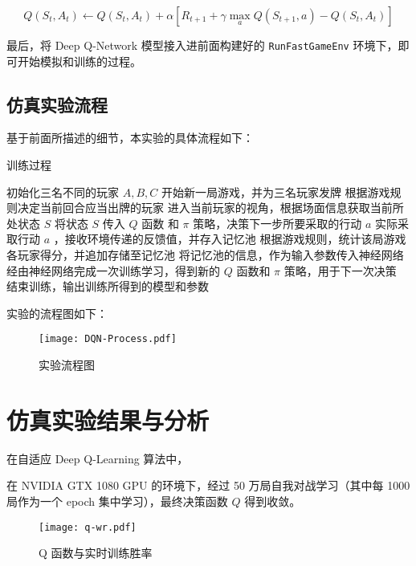 \begin{equation}
    Q(S_t,A_t)\leftarrow Q(S_t,A_t)+\alpha\left[R_{t+1}+\gamma  \max\limits_aQ(S_{t+1},a)-Q(S_t,A_t)\right]
\end{equation}

最后，将 Deep Q-Network 模型接入进前面构建好的 \texttt{RunFastGameEnv} 环境下，即可开始模拟和训练的过程。

\subsection{仿真实验流程}

基于前面所描述的细节，本实验的具体流程如下：

\begin{algorithm}[H]
    \caption{训练过程}
    \begin{algorithmic}[1] %
        \State 初始化三名不同的玩家 $A, B, C$
        \Repeat
        \State 开始新一局游戏，并为三名玩家发牌
        \Repeat
        \State 根据游戏规则决定当前回合应当出牌的玩家
        \State 进入当前玩家的视角，根据场面信息获取当前所处状态 $S$
        \State 将状态 $S$ 传入 $Q$ 函数 和 $\pi$ 策略，决策下一步所要采取的行动 $a$
        \State 实际采取行动 $a$ ，接收环境传递的反馈值，并存入记忆池
        \State 根据游戏规则，统计该局游戏各玩家得分，并追加存储至记忆池
        \State 将记忆池的信息，作为输入参数传入神经网络
        \State 经由神经网络完成一次训练学习，得到新的 $Q$ 函数和 $\pi$ 策略，用于下一次决策
        \State 结束训练，输出训练所得到的模型和参数
    \end{algorithmic}
\end{algorithm}

实验的流程图如下：

\begin{figure}[H]
    \centering
    \texttt{[image: DQN-Process.pdf]}
    \caption{实验流程图}
\end{figure}

\section{仿真实验结果与分析}

在自适应 Deep Q-Learning 算法中，

在 NVIDIA GTX 1080 GPU 的环境下，经过 50 万局自我对战学习（其中每 1000 局作为一个 epoch 集中学习），最终决策函数 $Q$ 得到收敛。

\begin{figure}[H]
    \texttt{[image: q-wr.pdf]}
    \caption{Q 函数与实时训练胜率}\label{img:q-wr}
\end{figure}

